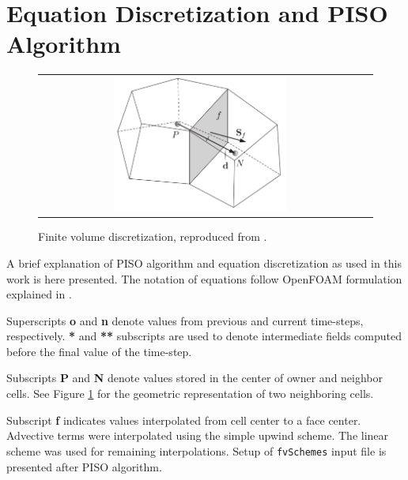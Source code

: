 
\section{Equation Discretization and PISO Algorithm}\label{appendix 3}

\begin{figure}[h]
 \centering
\begin{tabular}{cc}
 \includegraphics[width=0.55\textwidth]{./figuras/appA3/finite_volume.png}
\end{tabular}
 \caption{Finite volume discretization, reproduced from \cite{foamDev}.}
 \label{fig: fvm}
\end{figure}

A brief explanation of PISO algorithm and equation discretization as used in this work is here presented. The notation of equations follow OpenFOAM formulation explained in \cite{jasak}.

Superscripts \textbf{o} and \textbf{n} denote values from previous and current time-steps, respectively. \textbf{*} and \textbf{**} subscripts are used to denote intermediate fields computed before the final value of the time-step.

Subscripts \textbf{P} and \textbf{N} denote values stored in the center of owner and neighbor cells.  See Figure \ref{fig: fvm} for the geometric representation of two neighboring cells.

Subscript \textbf{f} indicates values interpolated from cell center to a face center. Advective terms were interpolated using the simple upwind scheme. The linear scheme was used for remaining interpolations. Setup of \verb|fvSchemes| input file is presented after PISO algorithm.

